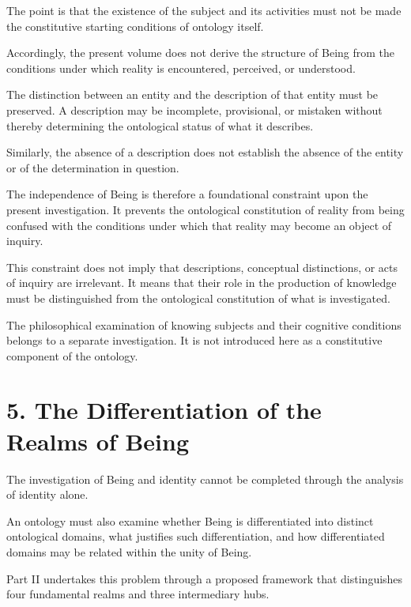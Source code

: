 The point is that the existence of the subject
and its activities must not be made the constitutive
starting conditions of ontology itself.

Accordingly, the present volume does not derive
the structure of Being from the conditions under
which reality is encountered, perceived, or understood.

The distinction between an entity and the description
of that entity must be preserved. A description
may be incomplete, provisional, or mistaken without
thereby determining the ontological status of what
it describes.

Similarly, the absence of a description does not
establish the absence of the entity or of the
determination in question.

The independence of Being is therefore a foundational
constraint upon the present investigation. It prevents
the ontological constitution of reality from being
confused with the conditions under which that reality
may become an object of inquiry.

This constraint does not imply that descriptions,
conceptual distinctions, or acts of inquiry are
irrelevant. It means that their role in the production
of knowledge must be distinguished from the
ontological constitution of what is investigated.

The philosophical examination of knowing subjects
and their cognitive conditions belongs to a separate
investigation. It is not introduced here as a
constitutive component of the ontology.


\section*{5. The Differentiation of the Realms of Being}

The investigation of Being and identity cannot
be completed through the analysis of identity alone.

An ontology must also examine whether Being
is differentiated into distinct ontological domains,
what justifies such differentiation, and how
differentiated domains may be related within
the unity of Being.

Part II undertakes this problem through a proposed
framework that distinguishes four fundamental
realms and three intermediary hubs.

